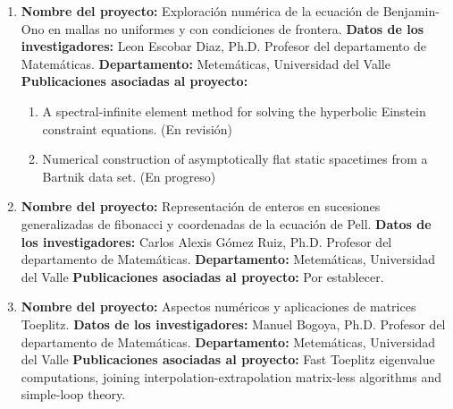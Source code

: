 \begin{spacing}{1.5}
\begin{enumerate}
        \item \textbf{Nombre del proyecto:} Exploración numérica de la ecuación de Benjamin-Ono en mallas no uniformes y con condiciones de frontera. \newline
        \textbf{Datos de los investigadores:} \newline
        Leon Escobar Diaz, Ph.D. Profesor del departamento de Matemáticas. \newline
        \textbf{Departamento: } Metemáticas, Universidad del Valle \newline
        \textbf{Publicaciones asociadas al proyecto: } \begin{enumerate}
            \item A spectral-infinite element method for solving the hyperbolic Einstein constraint equations. (En revisión)
            \item Numerical construction of asymptotically flat static spacetimes from a Bartnik data set. (En progreso)
        \end{enumerate}

        \item \textbf{Nombre del proyecto:} Representación de enteros en sucesiones generalizadas de fibonacci y coordenadas de la ecuación de Pell. \newline
        \textbf{Datos de los investigadores:} \newline
        Carlos Alexis Gómez Ruiz, Ph.D. Profesor del departamento de Matemáticas. \newline
        \textbf{Departamento: } Metemáticas, Universidad del Valle \newline
        \textbf{Publicaciones asociadas al proyecto: } \newline Por establecer.

        \item \textbf{Nombre del proyecto:} Aspectos numéricos y aplicaciones de matrices Toeplitz. \newline
        \textbf{Datos de los investigadores:} \newline
         Manuel Bogoya, Ph.D. Profesor del departamento de Matemáticas. 
        \textbf{Departamento: } Metemáticas, Universidad del Valle \newline
        \textbf{Publicaciones asociadas al proyecto: } \newline Fast Toeplitz eigenvalue computations, joining interpolation-extrapolation matrix-less algorithms and simple-loop theory. \cite{Proy4}


\end{enumerate}
\end{spacing}
